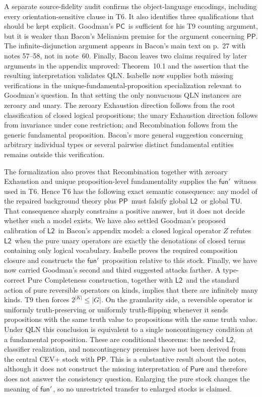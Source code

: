 \documentclass[12pt,leqno]{article}
\theoremstyle{plain}
\theoremstyle{definition}
\newcommand{\funp}{\ensuremath{\mathsf{fun}'\,}}
\newcommand{\Pure}{\ensuremath{\mathsf{Pure}}}
\newcommand{\PP}{\ensuremath{\mathsf{PP}}}
\newcommand{\Ltwo}{\ensuremath{\mathsf{L2}}}
\newcommand{\TU}{\ensuremath{\mathsf{TU}}}
\newcommand{\PC}{\ensuremath{\mathsf{PC}}}
\begin{document}
A separate source-fidelity audit confirms the object-language encodings,
including every orientation-sensitive clause in T6.  It also identifies
three qualifications that should be kept explicit.  Goodman's \PC\ is
sufficient for his T9 counting argument, but it is weaker than Bacon's
Melianism premise for the argument concerning \PP.  The infinite-disjunction
argument appears in Bacon's main text on p.~27 with notes 57--58, not in
  note~60.  Finally, Bacon leaves two claims required by later arguments in the
  appendix unproved: Theorem~10.1 and the assertion that the resulting
  interpretation validates QLN.  Isabelle now supplies both missing
  verifications in the unique-fundamental-proposition specialization relevant
  to Goodman's question.  In that setting the only nonvacuous QLN instances
  are zeroary and unary.  The zeroary Exhaustion direction follows from the
  root classification of closed logical propositions; the unary Exhaustion
  direction follows from invariance under cone restriction; and Recombination
  follows from the generic fundamental proposition.  Bacon's more general
  suggestion concerning arbitrary individual types or several pairwise
  distinct fundamental entities remains outside this verification.

The formalization also proves that Recombination together with zeroary
Exhaustion and unique proposition-level fundamentality supplies the
\(\funp\) witness used in T6.  Hence T6 has the following exact semantic
consequence: any model of the repaired background theory plus \PP\ must
falsify global \Ltwo\ or global \TU.  That consequence sharply constrains a
positive answer, but it does not decide whether such a model exists.  We have
also settled Goodman's proposed calibration of \Ltwo\ in Bacon's appendix
model: a closed logical operator \(Z\) refutes \Ltwo\ when the pure unary
operators are exactly the denotations of closed terms containing only logical
vocabulary.  Isabelle proves the required composition closure and constructs
the \(\funp\) proposition relative to this stock.
Finally, we have now carried Goodman's second and third suggested attacks
farther.  A type-correct Pure Completeness construction, together with
\Ltwo\ and the standard action of pure reversible operators on kinds,
implies that there are infinitely many kinds.  T9 then forces
\(2^{|K|}\leq |G|\).  On the granularity side, a reversible operator is
uniformly truth-preserving or uniformly truth-flipping whenever it sends
propositions with the same truth value to propositions with the same truth
value.  Under QLN this conclusion
is equivalent to a single noncontingency condition at a fundamental
proposition.  These are conditional theorems: the needed \Ltwo,
classifier realization, and noncontingency premises have not been derived from the
central CEV+ stock with \PP.
This is a substantive result about the notes, although it does not construct
the missing interpretation of \(\Pure\) and therefore does not answer the
consistency question.  Enlarging the pure stock changes the meaning of
\(\funp\), so no unrestricted transfer to enlarged stocks is claimed.
\end{document}

